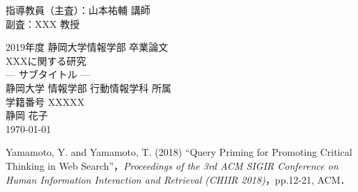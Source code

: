 \documentclass[a4paper,12pt,oneside,openany,autodetect-engine,dvipdfmx,platex]{jsreport}
\newcommand{\ChangeHeaderRule}{%
     \let\subsubsection\subsection
     \let\subsection\section
     \let\section\chapter
}
\begin{document}
\begin{titlepage}
\begin{flushright}
指導教員（主査）：山本祐輔 講師\\
副査：XXX 教授
\end{flushright}
\begin{center}
\vspace*{80pt}
{\large 2019年度 静岡大学情報学部 卒業論文}\\

\vspace*{40pt}
{\huge XXXに関する研究}\\
\vspace{10pt}
{\Large --- サブタイトル ---}\\
\vfill
{静岡大学 情報学部 行動情報学科 所属}\\
{学籍番号 XXXXX}\\
\vspace{20pt}
{静岡 花子}\\
\vspace{20pt}
{\today}\\
\end{center}
\vfill
\end{titlepage}


\begin{abstract}

\end{abstract}


\tableofcontents

\newpage
\listoffigures
\listoftables


\ChangeHeaderRule


















\vspace{2em}

\begin{thebibliography}{99}
Yamamoto, Y. and Yamamoto, T. (2018) ``Query Priming for Promoting Critical Thinking in Web Search''，\textit{Proceedings of the 3rd ACM SIGIR Conference on Human Information Interaction and Retrieval (CHIIR 2018)}，pp.12-21, ACM．
\end{thebibliography}


\end{document}
